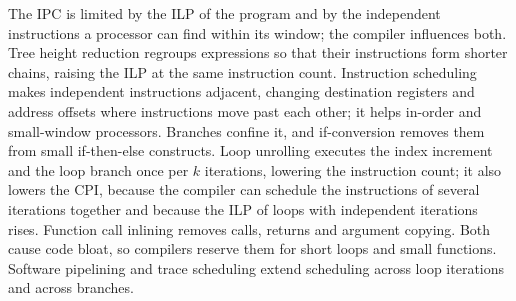\documentclass[../main.tex]{subfiles}
\begin{document}
\begin{keypoint}
  The IPC is limited by the ILP of the program and by the independent
  instructions a processor can find within its window; the compiler influences
  both.  Tree height reduction regroups expressions so that their instructions
  form shorter chains, raising the ILP at the same instruction count.
  Instruction scheduling makes independent instructions adjacent, changing
  destination registers and address offsets where instructions move past each
  other; it helps in-order and small-window processors.  Branches confine it,
  and if-conversion removes them from small if-then-else constructs.  Loop
  unrolling executes the index increment and the loop branch once per $k$
  iterations, lowering the instruction count; it also lowers the CPI, because
  the compiler can schedule the instructions of several iterations together
  and because the ILP of loops with independent iterations rises.  Function
  call inlining removes calls, returns and argument copying.  Both cause code
  bloat, so compilers reserve them for short loops and small functions.
  Software pipelining and trace scheduling extend scheduling across loop
  iterations and across branches.
\end{keypoint}
\end{document}
